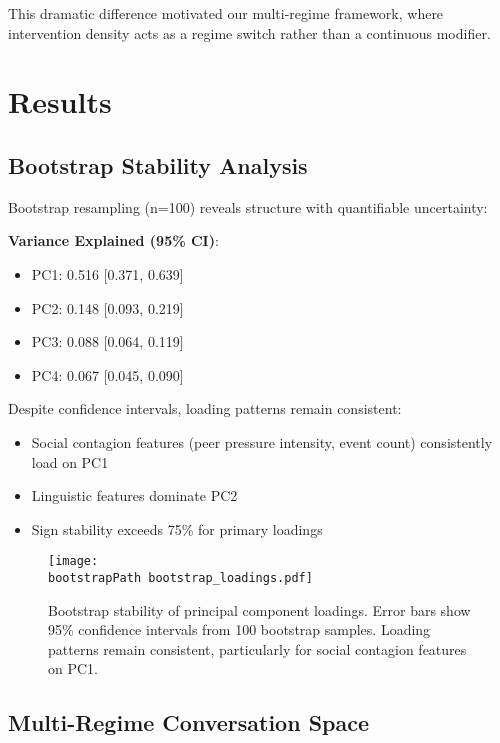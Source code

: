 \documentclass[11pt,letterpaper]{article}
\newcommand{\pcOneVarianceMean}{0.516}
\newcommand{\pcOneVarianceCI}{[0.371, 0.639]}
\newcommand{\pcTwoVarianceMean}{0.148}
\newcommand{\pcTwoVarianceCI}{[0.093, 0.219]}
\newcommand{\pcThreeVarianceMean}{0.088}
\newcommand{\pcThreeVarianceCI}{[0.064, 0.119]}
\newcommand{\pcFourVarianceMean}{0.067}
\newcommand{\pcFourVarianceCI}{[0.045, 0.090]}
\newcommand{\bootstrapSamples}{100}
\newcommand{\bootstrapPath}{../analysis/analysis_outputs_n110/bootstrap/}
\begin{document}
This dramatic difference motivated our multi-regime framework, where intervention density acts as a regime switch rather than a continuous modifier.

\section{Results}

\subsection{Bootstrap Stability Analysis}

Bootstrap resampling (n=\bootstrapSamples{}) reveals structure with quantifiable uncertainty:

\textbf{Variance Explained (95\% CI)}:
\begin{itemize}
    \item PC1: \pcOneVarianceMean{} \pcOneVarianceCI{}
    \item PC2: \pcTwoVarianceMean{} \pcTwoVarianceCI{}
    \item PC3: \pcThreeVarianceMean{} \pcThreeVarianceCI{}
    \item PC4: \pcFourVarianceMean{} \pcFourVarianceCI{}
\end{itemize}

Despite confidence intervals, loading patterns remain consistent:
\begin{itemize}
    \item Social contagion features (peer pressure intensity, event count) consistently load on PC1
    \item Linguistic features dominate PC2
    \item Sign stability exceeds 75\% for primary loadings
\end{itemize}

\begin{figure}[htbp]
\centering
\texttt{[image: \\bootstrapPath bootstrap\_loadings.pdf]}
\caption{Bootstrap stability of principal component loadings. Error bars show 95\% confidence intervals from \bootstrapSamples{} bootstrap samples. Loading patterns remain consistent, particularly for social contagion features on PC1.}
\label{fig:bootstrap_loadings}
\end{figure}

\subsection{Multi-Regime Conversation Space}
\end{document}

